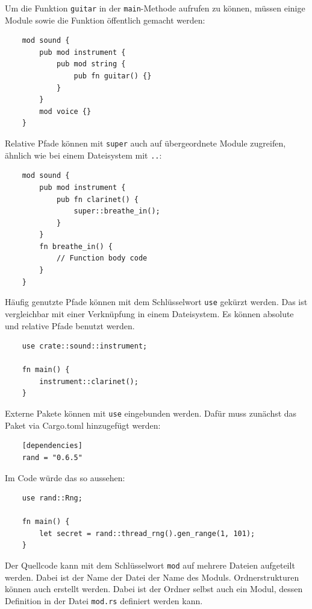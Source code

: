 Um die Funktion \verb"guitar" in der \verb"main"-Methode aufrufen zu können, müssen ei\-ni\-ge Module sowie die Funktion öffentlich gemacht werden:

\newpage

\begin{lstlisting}
    mod sound {
        pub mod instrument {
            pub mod string {
                pub fn guitar() {}
            }
        }
        mod voice {}
    }
\end{lstlisting}

Relative Pfade können mit \verb"super" auch auf übergeordnete Module zugreifen, ähnlich wie bei einem Dateisystem mit \glqq\verb".."\grqq{}:

\begin{lstlisting}
    mod sound {
        pub mod instrument {
            pub fn clarinet() {
                super::breathe_in();
            }
        }
        fn breathe_in() {
            // Function body code
        }
    }
\end{lstlisting}

Häufig genutzte Pfade können mit dem Schlüsselwort \verb"use" gekürzt werden. Das ist vergleichbar mit einer Verknüpfung in einem Dateisystem. Es können absolute und relative Pfade benutzt werden.

\begin{lstlisting}
    use crate::sound::instrument;

    fn main() {
        instrument::clarinet();
    }
\end{lstlisting}

Externe Pakete können mit \verb"use"  eingebunden werden. Dafür muss zunächst das Paket via Cargo.toml hinzugefügt werden:

\begin{lstlisting}
    [dependencies]
    rand = "0.6.5"
\end{lstlisting}

\newpage

\noindent Im Code würde das so aussehen:

\begin{lstlisting}
    use rand::Rng;

    fn main() {
        let secret = rand::thread_rng().gen_range(1, 101);
    }
\end{lstlisting}

Der Quellcode kann mit dem Schlüsselwort \verb"mod" auf mehrere Dateien aufgeteilt werden. Dabei ist der Name der Datei der Name des Moduls. Ordnerstrukturen können auch erstellt werden. Dabei ist der Ordner selbst auch ein Modul, dessen Definition in der Datei \verb"mod.rs" definiert werden kann.

